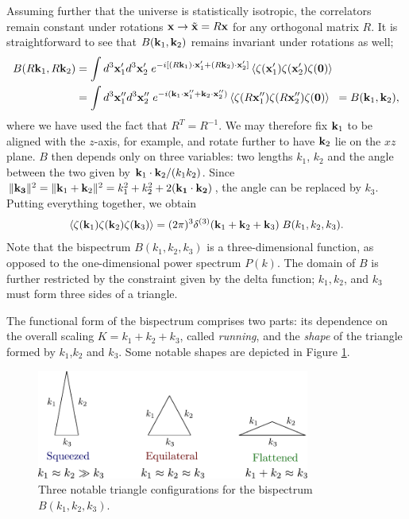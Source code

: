 Assuming further that the universe is statistically isotropic, the correlators remain constant under rotations $\mathbf{x} \rightarrow \tilde{\mathbf{x}} = R \mathbf{x}$ for any orthogonal matrix $R$. It is straightforward to see that $B(\mathbf{k}_1,\mathbf{k}_2)$ remains invariant under rotations as well;
\begin{align}
	B(R\mathbf{k}_1, R\mathbf{k}_2) &= \int d^3\mathbf{x}'_1 d^3\mathbf{x}'_2 \; e^{-i[ (R\mathbf{k}_1) \cdot \mathbf{x}'_1 + (R\mathbf{k}_2) \cdot \mathbf{x}'_2]} \left< \zeta(\mathbf{x}'_1) \zeta(\mathbf{x}'_2) \zeta(\mathbf{0}) \right> \\
	&= \int d^3\mathbf{x}''_1 d^3\mathbf{x}''_2 \; e^{-i( \mathbf{k}_1 \cdot \mathbf{x}''_1 + \mathbf{k}_2 \cdot \mathbf{x}''_2)} \left< \zeta(R \mathbf{x}''_1) \zeta(R \mathbf{x}''_2) \zeta(\mathbf{0}) \right> \;\;= B(\mathbf{k}_1, \mathbf{k}_2),
\end{align}
where we have used the fact that $R^T=R^{-1}$. We may therefore fix $\mathbf{k}_1$ to be aligned with the $z$-axis, for example, and rotate further to have $\mathbf{k}_2$ lie on the $xz$ plane. $B$ then depends only on three variables: two lengths $k_1$, $k_2$ and the angle between the two given by $\mathbf{k}_1 \cdot \mathbf{k}_2 / (k_1 k_2)$. Since $\| \mathbf{k_3} \|^2 = \| \mathbf{k}_1+\mathbf{k}_2 \|^2 = k_1^2 + k_2^2 + 2(\mathbf{k_1}\cdot\mathbf{k_2})$, the angle can be replaced by $k_3$. Putting everything together, we obtain
\begin{align}
	\left< \zeta(\mathbf{k}_1) \zeta(\mathbf{k}_2) \zeta(\mathbf{k}_3) \right> =  (2\pi)^3 \delta^{(3)}(\mathbf{k}_1 + \mathbf{k}_2 + \mathbf{k}_3) \; B(k_1, k_2, k_3).
\end{align}
Note that the bispectrum $B(k_1,k_2,k_3)$ is a three-dimensional function, as opposed to the one-dimensional power spectrum $P(k)$. The domain of $B$ is further restricted by the constraint given by the delta function; $k_1,k_2$, and $k_3$ must form three sides of a triangle.

The functional form of the bispectrum comprises two parts: its dependence on the overall scaling $K=k_1+k_2+k_3$, called \textit{running}, and the \textit{shape} of the triangle formed by $k_1$,$k_2$ and $k_3$. Some notable shapes are depicted in Figure \ref{fig:triangle_configurations}.

\begin{figure}
	\centering
	\includegraphics[width=0.8\textwidth]{triangle_configurations.pdf}
	\hspace{10pt}
	\caption{Three notable triangle configurations for the bispectrum $B(k_1,k_2,k_3)$.}
	\label{fig:triangle_configurations}
\end{figure}

